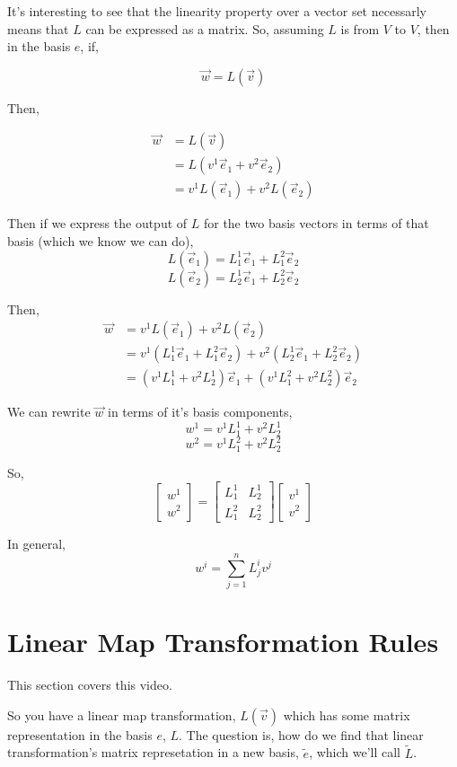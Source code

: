 \documentclass[12pt]{book}
\theoremstyle{plain}
\theoremstyle{definition}
\theoremstyle{ppart}
\theoremstyle{case}
\theoremstyle{solution}
\begin{document}
It's interesting to see that the linearity property over a vector set necessarly means that $L$ can be expressed as a matrix.
So, assuming $L$ is from $V$ to $V$, then in the basis $e$, if,

\[ \vec{w} = L(\vec{v}) \]

Then,

\begin{align*}
  \vec{w} &= L(\vec{v}) \\
  &= L(v^1 \vec{e}_1 + v^2 \vec{e}_2) \\
  &= v^1 L(\vec{e}_1) + v^2 L(\vec{e}_2)
\end{align*}

Then if we express the output of $L$ for the two basis vectors in terms of that basis (which we know we can do),
\[ L(\vec{e}_1) = L^1_1 \vec{e}_1 + L^2_1 \vec{e}_2 \]
\[ L(\vec{e}_2) = L^1_2 \vec{e}_1 + L^2_2 \vec{e}_2 \]

Then, 
\begin{align*}
  \vec{w} 
  &= v^1 L(\vec{e}_1) + v^2 L(\vec{e}_2) \\
  &= v^1 (L^1_1 \vec{e}_1 + L^2_1 \vec{e}_2) + v^2 (L^1_2 \vec{e}_1 + L^2_2 \vec{e}_2) \\
  &= (v^1 L^1_1 + v^2 L^1_2) \vec{e}_1 + (v^1 L^2_1 + v^2 L^2_2) \vec{e}_2
\end{align*}

We can rewrite $\vec{w}$ in terms of it's basis components,
\[ w^1 = v^1 L^1_1 + v^2 L^1_2 \]
\[ w^2 = v^1 L^2_1 + v^2 L^2_2 \]

So,
\[
  \begin{bmatrix}
  w^1 \\
  w^2
  \end{bmatrix}
  =
  \begin{bmatrix}
  L^1_1 & L^1_2 \\
  L^2_1 & L^2_2
  \end{bmatrix}
  \begin{bmatrix}
  v^1 \\
  v^2
  \end{bmatrix}
\]

In general,
\[ w^i = \sum_{j=1}^n L^i_j v^j \]

\section{Linear Map Transformation Rules}

This section covers this \cite{youtube:tensor7} video.

So you have a linear map transformation, $L(\vec{v})$ which 
has some matrix representation in the basis $e$, $L$. The question is,
how do we find that linear transformation's matrix represetation in a new basis, $\widetilde{e}$, which
we'll call $\widetilde{L}$.
\end{document}

